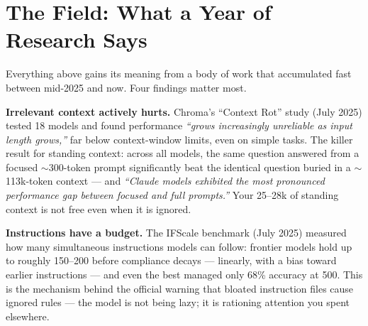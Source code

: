\documentclass[11pt,letterpaper]{article}
\begin{document}
\acbreak

\section{The Field: What a Year of Research Says}

Everything above gains its meaning from a body of work that accumulated fast between mid-2025 and now. Four findings matter most.

\textbf{Irrelevant context actively hurts.} Chroma's ``Context Rot'' study (July 2025) tested 18 models and found performance \textit{``grows increasingly unreliable as input length grows,''} far below context-window limits, even on simple tasks. The killer result for standing context: across all models, the same question answered from a focused $\sim$300-token prompt significantly beat the identical question buried in a $\sim$113k-token context --- and \textit{``Claude models exhibited the most pronounced performance gap between focused and full prompts.''} Your 25--28k of standing context is not free even when it is ignored.

\textbf{Instructions have a budget.} The IFScale benchmark (July 2025) measured how many simultaneous instructions models can follow: frontier models hold up to roughly 150--200 before compliance decays --- linearly, with a bias toward earlier instructions --- and even the best managed only 68\% accuracy at 500. This is the mechanism behind the official warning that bloated instruction files cause ignored rules --- the model is not being lazy; it is rationing attention you spent elsewhere.
\end{document}
